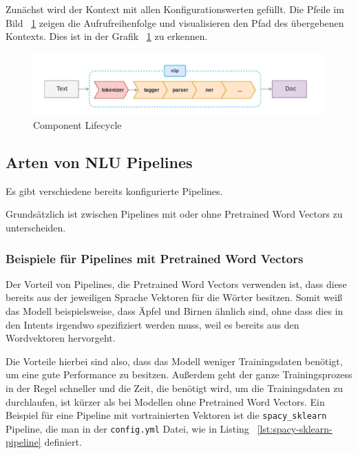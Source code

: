 Zunächst wird der Kontext mit allen Konfigurationswerten gefüllt.
Die Pfeile im Bild ~\ref{fig:pipeline_image} zeigen die Aufrufreihenfolge und visualisieren den Pfad des übergebenen Kontexts.\cite{componentLifecycle, componentLifecycleDoc}
Dies ist in der Grafik ~\ref{fig:pipeline_image} zu erkennen.

\begin{figure}[hbt!]
    \centering
    \includegraphics[scale=0.5]{pics/pipeline}
    \caption{Component Lifecycle~\cite{pipelineImage}}
    \label{fig:pipeline_image}
\end{figure}

\subsection{Arten von NLU Pipelines}\label{subsec:pipeline-types}

Es gibt verschiedene bereits konfigurierte Pipelines.\cite{howToChooseAPipeline}

Grundsätzlich ist zwischen Pipelines mit oder ohne Pretrained Word Vectors zu unterscheiden.

\subsubsection{Beispiele für Pipelines mit Pretrained Word Vectors}

Der Vorteil von Pipelines, die Pretrained Word Vectors verwenden ist, dass diese bereits aus der jeweiligen Sprache Vektoren für die Wörter besitzen.
Somit weiß das Modell beispielsweise, dass Äpfel und Birnen ähnlich sind, ohne dass dies in den Intents irgendwo spezifiziert werden muss, weil es bereits aus den Wordvektoren hervorgeht.\cite{differenceStackOverflow, rasaMasterclassPreConfiguredPipelines}

Die Vorteile hierbei sind also, dass das Modell weniger Trainingsdaten benötigt, um eine gute Performance zu besitzen.
Außerdem geht der ganze Trainingsprozess in der Regel schneller und die Zeit, die benötigt wird, um die Trainingsdaten zu durchlaufen, ist kürzer als bei Modellen ohne Pretrained Word Vectors.\cite{differenceStackOverflow, pretrainedVsSupervised, rasaMasterclassPreConfiguredPipelines}
Ein Beispiel für eine Pipeline mit vortrainierten Vektoren ist die \texttt{spacy\_sklearn} Pipeline, die man in der \texttt{config.yml} Datei, wie in Listing ~\ref{lst:spacy-sklearn-pipeline} definiert.

